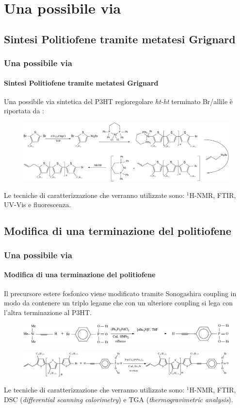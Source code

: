 \documentclass{beamer}
\begin{document}
\section{Una possibile via}\subsection{Sintesi Politiofene tramite metatesi Grignard}
    \begin{frame}
      \frametitle{Una possibile via}\framesubtitle{Sintesi Politiofene tramite metatesi Grignard}
      Una possibile via sintetica del P3HT regioregolare \emph{ht-ht} terminato Br/allile è riportata da \citet{lig-p3ht-CdSe-end}:

	\begin{figure}
	  \includegraphics[scale=0.27]{immagini/grim+end.png}
	\end{figure}
	Le tecniche di caratterizzazione che verranno utilizzate sono: $^1$H-NMR, FTIR, UV-Vis e fluorescenza.

    \end{frame}


  \subsection{Modifica di una terminazione del politiofene}
    \begin{frame}
      \frametitle{Una possibile via}\framesubtitle{Modifica di una terminazione del politiofene}
      Il precursore estere fosfonico viene modificato tramite Sonogashira coupling in modo da contenere un triplo legame che con un ulteriore coupling si lega con l'altra terminazione al P3HT.

\citep{sonog-rev}
	\begin{figure} 
	\includegraphics[scale=0.34]{immagini/sintesilegantepro.png}
	\end{figure}
	\begin{figure} 
	\includegraphics[scale=0.34]{immagini/p3ht+legante.png}
	\end{figure}\pause
	Le tecniche di caratterizzazione che verranno utilizzate sono: $^1$H-NMR, FTIR, DSC (\emph{differential scanning calorimetry}) e TGA (\emph{thermogravimetric analysis}).
    \end{frame}
\end{document}
